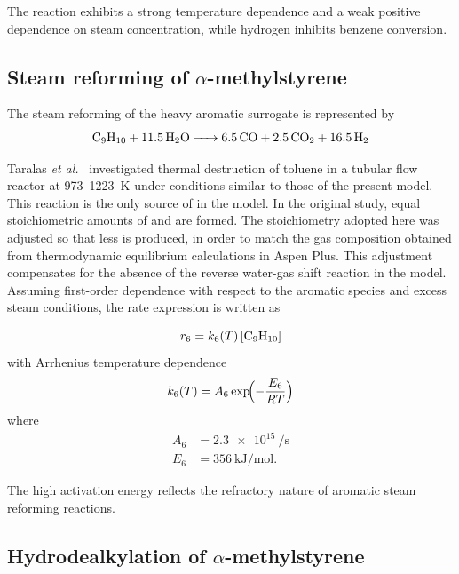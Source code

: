 The reaction exhibits a strong temperature dependence and a weak positive dependence on steam concentration, while hydrogen inhibits benzene conversion.

\subsection{Steam reforming of \texorpdfstring{\(\alpha\)}{alpha}-methylstyrene}\label{ssec:steam_reforming_AMS}

The steam reforming of the heavy aromatic surrogate is represented by
%
\begin{equation}
  \ce{C9H10 + 11.5 H2O -> 6.5 CO + 2.5 CO2 + 16.5 H2}
  \label{eq:rxn6}
\end{equation}

Taralas \textit{et al.}~\cite{Taralas2003} investigated thermal destruction of toluene in a tubular flow reactor at 973--1223~K under conditions similar to those of the present model. This reaction is the only source of  in the model. In the original study, equal stoichiometric amounts of  and  are formed. The stoichiometry adopted here was adjusted so that less  is produced, in order to match the gas composition obtained from thermodynamic equilibrium calculations in Aspen Plus. This adjustment compensates for the absence of the reverse water-gas shift reaction in the model. Assuming first-order dependence with respect to the aromatic species and excess steam conditions, the rate expression is written as

%
\begin{equation}
  r_6 = k_6(T)\,[\ce{C9H10}]
  \label{eq:rate6}
\end{equation}
%
with Arrhenius temperature dependence
%
\begin{equation}
  k_6(T) = A_6 \exp\!\Bigl(-\frac{E_6}{RT}\Bigr)
  \label{eq:k6}
\end{equation}
%
where
%
\begin{align}
  A_6 &= \SI{2.3e15}{\per\second} \label{eq:A6} \\
  E_6 &= \SI{356}{\kilo\joule\per\mole}. \label{eq:E6}
\end{align}

The high activation energy reflects the refractory nature of aromatic steam reforming reactions.

\subsection{Hydrodealkylation of \texorpdfstring{\(\alpha\)}{alpha}-methylstyrene}\label{ssec:hydrodealkylation}

